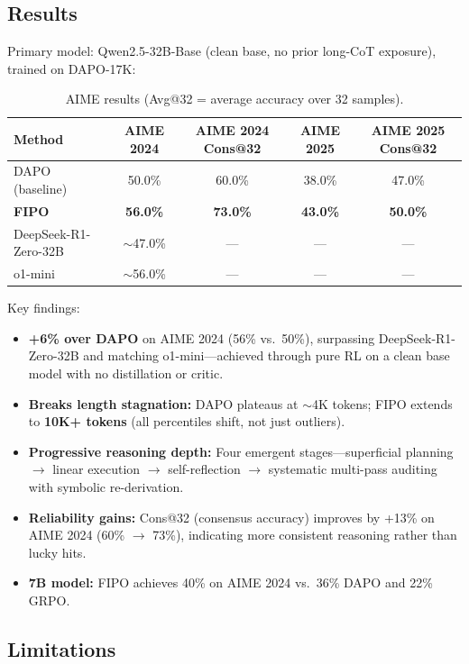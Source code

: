 \documentclass[11pt]{article}
\begin{document}
\subsection{Results}

Primary model: Qwen2.5-32B-Base (clean base, no prior long-CoT exposure), trained on DAPO-17K:

\begin{table}[h]
\centering
\caption{AIME results (Avg@32 = average accuracy over 32 samples).}
\begin{tabular}{lcccc}
\toprule
\textbf{Method} & \textbf{AIME 2024} & \textbf{AIME 2024 Cons@32} & \textbf{AIME 2025} & \textbf{AIME 2025 Cons@32} \\
\midrule
DAPO (baseline) & 50.0\% & 60.0\% & 38.0\% & 47.0\% \\
\textbf{FIPO} & \textbf{56.0\%} & \textbf{73.0\%} & \textbf{43.0\%} & \textbf{50.0\%} \\
\midrule
DeepSeek-R1-Zero-32B & $\sim$47.0\% & --- & --- & --- \\
o1-mini & $\sim$56.0\% & --- & --- & --- \\
\bottomrule
\end{tabular}
\end{table}

Key findings:
\begin{itemize}
    \item \textbf{+6\% over DAPO} on AIME 2024 (56\% vs.\ 50\%), surpassing DeepSeek-R1-Zero-32B and matching o1-mini---achieved through pure RL on a clean base model with no distillation or critic.
    \item \textbf{Breaks length stagnation:} DAPO plateaus at $\sim$4K tokens; FIPO extends to \textbf{10K+ tokens} (all percentiles shift, not just outliers).
    \item \textbf{Progressive reasoning depth:} Four emergent stages---superficial planning $\to$ linear execution $\to$ self-reflection $\to$ systematic multi-pass auditing with symbolic re-derivation.
    \item \textbf{Reliability gains:} Cons@32 (consensus accuracy) improves by +13\% on AIME 2024 (60\% $\to$ 73\%), indicating more consistent reasoning rather than lucky hits.
    \item \textbf{7B model:} FIPO achieves 40\% on AIME 2024 vs.\ 36\% DAPO and 22\% GRPO.
\end{itemize}

\subsection{Limitations}
\end{document}
